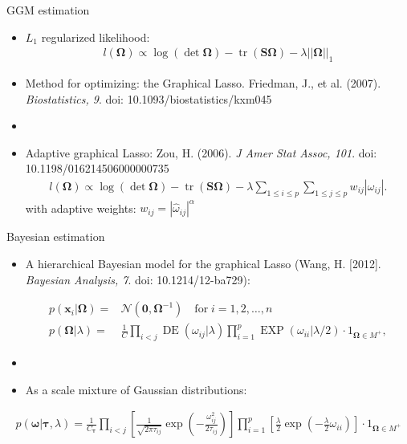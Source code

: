 \documentclass[xcolor=dvipsnames]{beamer}
\DeclareMathOperator{\tr}{tr}
\DeclareMathOperator{\DE}{DE}
\DeclareMathOperator{\EXP}{EXP}
\begin{document}
\begin{frame}{GGM estimation}
	\vspace{-15.5pt}
	\begin{itemize}
		\item $L_1$ regularized likelihood:
		\begin{align*}
		l(\boldsymbol{\Omega})\propto\log (\det \boldsymbol{\Omega})-\tr \left( \textbf{S} \boldsymbol{\Omega} \right)-\lambda ||\boldsymbol{\Omega}||_1
		\end{align*}
		\item Method for optimizing: the Graphical Lasso. Friedman, J., et al. (2007). \emph{Biostatistics, 9}. doi: 10.1093/biostatistics/kxm045
		\item[]
		\item Adaptive graphical Lasso: Zou, H. (2006).  \emph{J Amer Stat Assoc, 101}. doi: 10.1198/016214506000000735 
		\begin{align*}
				l(\boldsymbol{\Omega})\propto \log(\det \boldsymbol{\Omega})-\tr \left(\mathbf{S} \boldsymbol{\Omega}\right) - \lambda \sum_{1\leq i \leq p} \sum_{1 \leq j \leq p} w_{ij} |\omega_{ij}|.
		\end{align*}
		with adaptive weights: $w_{ij}=|\hat{\omega}_{ij}|^\alpha$
	\end{itemize}
\end{frame}

\begin{frame}{Bayesian estimation}
	\vspace{-5.5pt}
\begin{itemize}
	\item A hierarchical Bayesian model for the graphical Lasso (Wang, H. [2012]. \emph{Bayesian Analysis, 7}. doi: 10.1214/12-ba729): 
	
		\begin{align*}
		p(\textbf{x}_i|\boldsymbol{\Omega}) =& \mathcal{N}(\textbf{0},\boldsymbol{\Omega}^{-1}) \quad \text{for} \; i=1,2,\hdots,n\\
		p(\boldsymbol{\Omega}|\lambda) =& \frac{1}{C} \prod_{i<j} \DE(\omega_{ij}|\lambda) \prod_{i=1}^{p} \EXP (\omega_{ii} | \lambda / 2) \cdot 1_{\boldsymbol{\Omega}\in M^+},
		\end{align*}
	\item[]
	\item As a scale mixture of Gaussian distributions:
\end{itemize}
		\begin{align*}
		p(\boldsymbol{\omega}| \boldsymbol{\tau},\lambda)=\frac{1}{C_{\boldsymbol{\tau}}} \prod_{i<j} \left[ \frac{1}{\sqrt{2\pi \tau_{ij}}} \exp \left(- \frac{\omega_{ij}^2}{2\tau_{ij}}\right) \right] 
		\prod_{i=1}^{p}  \left[\frac{\lambda}{2} \exp \left(-\frac{\lambda}{2}\omega_{ii} \right)\right] \cdot 1_{\boldsymbol{\Omega}\in M^+}
		\end{align*}
\end{frame}
\end{document}
